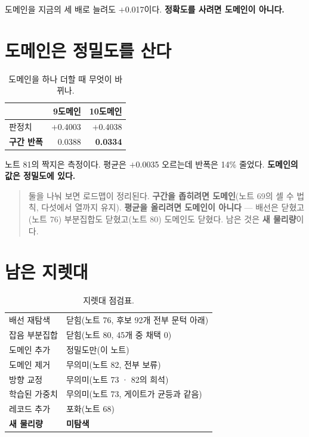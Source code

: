 \documentclass[10pt]{article}
\begin{document}
도메인을 지금의 세 배로 늘려도 $+$0.017이다. \textbf{정확도를 사려면 도메인이
아니다.}

\section{도메인은 정밀도를 산다}

\begin{table}[t]
\centering\tsize
\caption{도메인을 하나 더할 때 무엇이 바뀌나.}
\begin{tabular}{lrr}
\toprule
& 9도메인 & 10도메인 \\
\midrule
판정치 & $+$0.4003 & $+$0.4038 \\
\textbf{구간 반폭} & 0.0388 & \textbf{0.0334} \\
\bottomrule
\end{tabular}
\end{table}

노트 81의 짝지은 측정이다. 평균은 $+$0.0035 오르는데 반폭은 14\% 줄었다.
\textbf{도메인의 값은 정밀도에 있다.}

\begin{quote}\fontsize{9.5}{11.5}\selectfont
둘을 나눠 보면 로드맵이 정리된다. \textbf{구간을 좁히려면 도메인}(노트 69의
셀 수 법칙, 다섯에서 열까지 유지). \textbf{평균을 올리려면 도메인이 아니다}
--- 배선은 닫혔고(노트 76) 부분집합도 닫혔고(노트 80) 도메인도 닫혔다.
남은 것은 \textbf{새 물리량}이다.
\end{quote}

\section{남은 지렛대}

\begin{table}[t]
\centering\tsize
\caption{지렛대 점검표.}
\begin{tabular}{ll}
\toprule
배선 재탐색 & 닫힘(노트 76, 후보 92개 전부 문턱 아래) \\
잡음 부분집합 & 닫힘(노트 80, 45개 중 채택 0) \\
도메인 추가 & 정밀도만(이 노트) \\
도메인 제거 & 무의미(노트 82, 전부 보류) \\
방향 교정 & 무의미(노트 73 · 82의 희석) \\
학습된 가중치 & 무의미(노트 73, 게이트가 균등과 같음) \\
레코드 추가 & 포화(노트 68) \\
\textbf{새 물리량} & \textbf{미탐색} \\
\bottomrule
\end{tabular}
\end{table}
\end{document}
